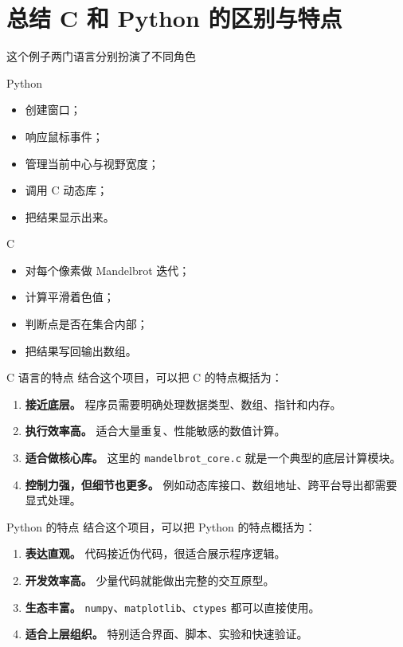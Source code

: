 \documentclass[aspectratio=169,11pt]{ctexbeamer}
\begin{document}
\section{总结 C 和 Python 的区别与特点}

\begin{frame}{这个例子两门语言分别扮演了不同角色}

\begin{block}{Python}
\begin{itemize}
  \item 创建窗口；
  \item 响应鼠标事件；
  \item 管理当前中心与视野宽度；
  \item 调用 C 动态库；
  \item 把结果显示出来。
\end{itemize}
\end{block}

\begin{block}{C}
\begin{itemize}
  \item 对每个像素做 Mandelbrot 迭代；
  \item 计算平滑着色值；
  \item 判断点是否在集合内部；
  \item 把结果写回输出数组。
\end{itemize}
\end{block}
\end{frame}

\begin{frame}{C 语言的特点}
结合这个项目，可以把 C 的特点概括为：

\begin{enumerate}
  \item \textbf{接近底层。}  
  程序员需要明确处理数据类型、数组、指针和内存。
  \item \textbf{执行效率高。}  
  适合大量重复、性能敏感的数值计算。
  \item \textbf{适合做核心库。}  
  这里的 \texttt{mandelbrot\_core.c} 就是一个典型的底层计算模块。
  \item \textbf{控制力强，但细节也更多。}  
  例如动态库接口、数组地址、跨平台导出都需要显式处理。
\end{enumerate}
\end{frame}

\begin{frame}{Python 的特点}
结合这个项目，可以把 Python 的特点概括为：

\begin{enumerate}
  \item \textbf{表达直观。}  
  代码接近伪代码，很适合展示程序逻辑。
  \item \textbf{开发效率高。}  
  少量代码就能做出完整的交互原型。
  \item \textbf{生态丰富。}  
  \texttt{numpy}、\texttt{matplotlib}、\texttt{ctypes} 都可以直接使用。
  \item \textbf{适合上层组织。}  
  特别适合界面、脚本、实验和快速验证。
\end{enumerate}
\end{frame}
\end{document}
